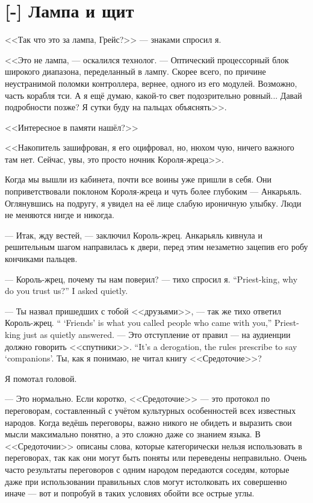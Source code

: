 \section{[-] Лампа и щит}

\textspace

<<Так что это за лампа, Грейс?>> --- знаками спросил я.

<<Это не лампа, --- оскалился технолог.
--- Оптический процессорный блок широкого диапазона, переделанный в лампу.
Скорее всего, по причине неустранимой поломки контроллера, вернее, одного из его модулей.
Возможно, часть корабля тси.
А я ещё думаю, какой-то свет подозрительно ровный...
Давай подробности позже?
Я сутки буду на пальцах объяснять>>.

<<Интересное в памяти нашёл?>>

<<Накопитель зашифрован, я его оцифровал, но, нюхом чую, ничего важного там нет.
Сейчас, увы, это просто ночник Короля-жреца>>.

Когда мы вышли из кабинета, почти все воины уже пришли в себя.
Они поприветствовали поклоном Короля-жреца и чуть более глубоким --- Анкарьяль.
Оглянувшись на подругу, я увидел на её лице слабую ироничную улыбку.
Люди не меняются нигде и никогда.

--- Итак, жду вестей, --- заключил Король-жрец.
Анкарьяль кивнула и решительным шагом направилась к двери, перед этим незаметно зацепив его робу кончиками пальцев.

{--- Король-жрец, почему ты нам поверил? --- тихо спросил я.}
{``Priest-king, why do you trust us?'' I asked quietly.}

{--- Ты назвал пришедших с тобой <<друзьями>>, --- так же тихо ответил Король-жрец.}
{`` `Friends' is what you called people who came with you,'' Priest-king just as quietly answered.}
{--- Это отступление от правил --- на аудиенции должно говорить <<спутники>>.}
{``It's a derogation, the rules prescribe to say `companions'.}
Ты, как я понимаю, не читал книгу <<Средоточие>>?

Я помотал головой.

--- Это нормально.
Если коротко, <<Средоточие>> --- это протокол по переговорам, составленный с учётом культурных особенностей всех известных народов.
Когда ведёшь переговоры, важно никого не обидеть и выразить свои мысли максимально понятно, а это сложно даже со знанием языка.
В <<Средоточии>> описаны слова, которые категорически нельзя использовать в переговорах, так как они могут быть поняты или переведены неправильно.
Очень часто результаты переговоров с одним народом передаются соседям, которые даже при использовании правильных слов могут истолковать их совершенно иначе --- вот и попробуй в таких условиях обойти все острые углы.

